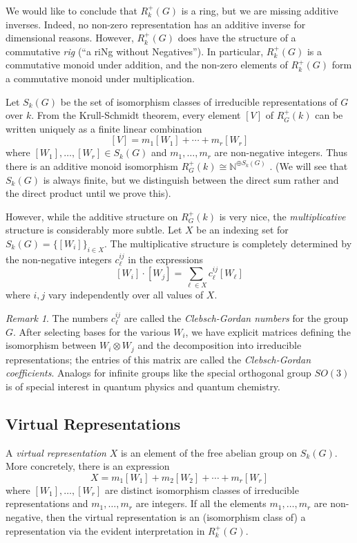 \documentclass[12pt]{article}
\theoremstyle{plain}
\theoremstyle{definition}
\theoremstyle{remark}
\newtheorem{remark}[theorem]{Remark}
\numberwithin{equation}{section}
\begin{document}
We would like to conclude that $R^+_k(G)$ is a ring,
but we are missing additive inverses.  Indeed, no non-zero
representation has an additive inverse for dimensional reasons.
However, $R^+_k(G)$ does have the structure of a commutative \emph{rig}
(``a riNg without Negatives'').
In particular, $R^+_k(G)$ is a commutative monoid under addition,
and the non-zero elements of $R^+_k(G)$ form a commutative monoid under
multiplication.

Let $S_k(G)$ be the set of isomorphism classes of
irreducible representations of $G$ over $k$.
From the Krull-Schmidt theorem, every element $[V]$ of $R^+_G(k)$
can be written uniquely as a finite linear combination
\[
[V] = m_1 [W_1] + \cdots + m_r [W_r]
\]
where $[W_1],\ldots,[W_r] \in S_k(G)$ and $m_1,\ldots, m_r$ are
non-negative integers.
Thus there is an additive monoid isomorphism
$R^+_G(k) \cong \mathbb{N}^{\oplus S_k(G)}$ .
(We will see that $S_k(G)$ is always finite, but we distinguish between
the direct sum rather and the direct product until we prove this).

However, while the additive structure on $R^+_G(k)$ is very nice,
the \emph{multiplicative} structure is considerably more subtle.
Let $X$ be an indexing set for $S_k(G) = \{[W_i]\}_{i \in X}$.
The multiplicative structure is completely determined by the
non-negative integers $c^{ij}_\ell$ in the expressions
\[
[W_i] \cdot [W_j] = \sum_{\ell \in X} c^{ij}_\ell [W_\ell]
\]
where $i,j$ vary independently over all values of $X$.

\begin{remark}
The numbers $c^{ij}_\ell$ are called the \emph{Clebsch-Gordan numbers}
for the group $G$.  After selecting bases for the various $W_i$,
we have explicit matrices defining the isomorphism between
$W_i \otimes W_j$ and the decomposition into irreducible representations;
the entries of this matrix are called the \emph{Clebsch-Gordan
coefficients}.  Analogs for infinite groups like the special orthogonal
group $SO(3)$ is of special interest in quantum physics and quantum
chemistry.
\end{remark}

\subsection{Virtual Representations}

A \emph{virtual representation} $X$ is an element of the free abelian
group on $S_k(G)$.
More concretely, there is an expression
\[
X = m_1 [W_1] + m_2 [W_2] + \cdots + m_r [W_r]
\]
where $[W_1],\ldots,[W_r]$ are distinct isomorphism classes of
irreducible representations
and $m_1,\ldots, m_r$ are integers.
If all the elements $m_1,\ldots,m_r$ are non-negative,
then the virtual representation is an (isomorphism class of) a
representation via the evident interpretation in $R^+_k(G)$.
\end{document}
